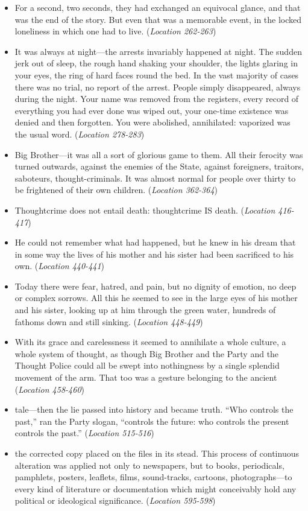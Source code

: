 \documentclass[12pt]{article}
\begin{document}
\begin{itemize}
\item {For a second, two seconds, they had exchanged an equivocal glance, and that was the end of the story. But even that was a memorable event, in the locked loneliness in which one had to live. (\textit{Location 262-263})}
\item {It was always at night—the arrests invariably happened at night. The sudden jerk out of sleep, the rough hand shaking your shoulder, the lights glaring in your eyes, the ring of hard faces round the bed. In the vast majority of cases there was no trial, no report of the arrest. People simply disappeared, always during the night. Your name was removed from the registers, every record of everything you had ever done was wiped out, your one-time existence was denied and then forgotten. You were abolished, annihilated: vaporized was the usual word. (\textit{Location 278-283})}
\item {Big Brother—it was all a sort of glorious game to them. All their ferocity was turned outwards, against the enemies of the State, against foreigners, traitors, saboteurs, thought-criminals. It was almost normal for people over thirty to be frightened of their own children. (\textit{Location 362-364})}
\item {Thoughtcrime does not entail death: thoughtcrime IS death. (\textit{Location 416-417})}
\item {He could not remember what had happened, but he knew in his dream that in some way the lives of his mother and his sister had been sacrificed to his own. (\textit{Location 440-441})}
\item {Today there were fear, hatred, and pain, but no dignity of emotion, no deep or complex sorrows. All this he seemed to see in the large eyes of his mother and his sister, looking up at him through the green water, hundreds of fathoms down and still sinking. (\textit{Location 448-449})}
\item {With its grace and carelessness it seemed to annihilate a whole culture, a whole system of thought, as though Big Brother and the Party and the Thought Police could all be swept into nothingness by a single splendid movement of the arm. That too was a gesture belonging to the ancient (\textit{Location 458-460})}
\item {tale—then the lie passed into history and became truth. “Who controls the past,” ran the Party slogan, “controls the future: who controls the present controls the past.” (\textit{Location 515-516})}
\item {the corrected copy placed on the files in its stead. This process of continuous alteration was applied not only to newspapers, but to books, periodicals, pamphlets, posters, leaflets, films, sound-tracks, cartoons, photographs—to every kind of literature or documentation which might conceivably hold any political or ideological significance. (\textit{Location 595-598})}

\end{itemize}
\end{document}

